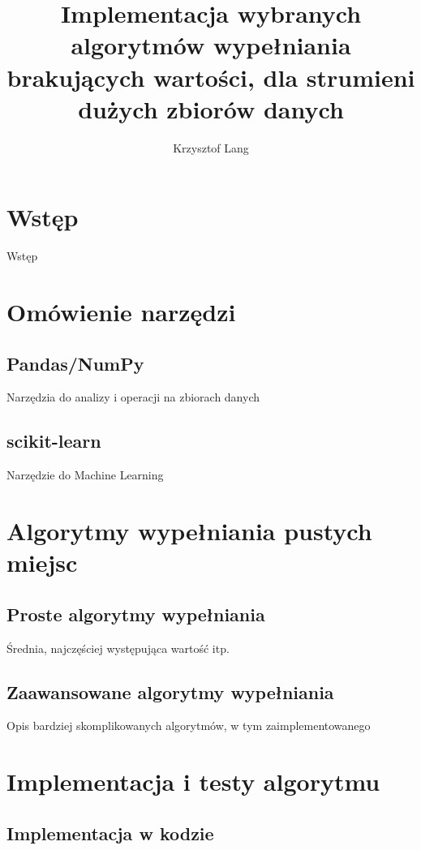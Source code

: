 \documentclass[12pt,twoside]{article}
\author{Krzysztof Lang}
\title{Implementacja wybranych algorytmów wypełniania brakujących wartości, dla strumieni dużych zbiorów danych}
\begin{document}
\maketitle

\blankpage

\tableofcontents

\clearpage
\blankpage


\section{Wstęp}
Wstęp

\clearpage

\section{Omówienie narzędzi}

\subsection{Pandas/NumPy}
Narzędzia do analizy i operacji na zbiorach danych

\subsection{scikit-learn}
Narzędzie do Machine Learning
\clearpage

\section{Algorytmy wypełniania pustych miejsc}
\subsection{Proste algorytmy wypełniania}
Średnia, najczęściej występująca wartość itp.
\subsection{Zaawansowane algorytmy wypełniania}
Opis bardziej skomplikowanych algorytmów, w tym zaimplementowanego
\clearpage

\section{Implementacja i testy algorytmu}
\subsection{Implementacja w kodzie}
\end{document}
